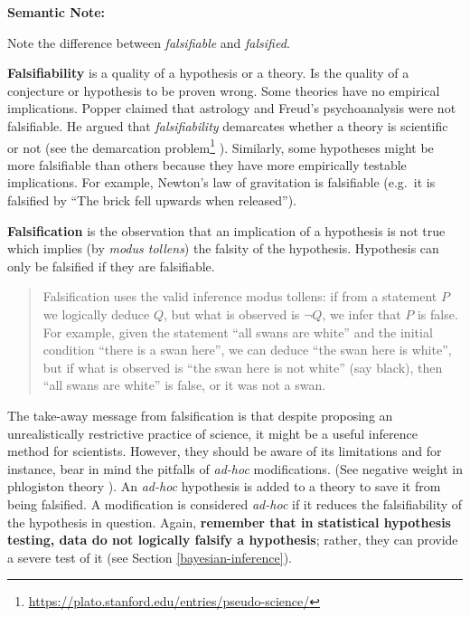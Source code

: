 \documentclass[
  12pt,
]{book}
\DeclareRobustCommand{\href}[2]{#2\footnote{\url{#1}}}
\begin{document}
\begin{tipbox}

\textbf{Semantic Note:}

Note the difference between \emph{falsifiable} and \emph{falsified}.

\textbf{Falsifiability} is a quality of a hypothesis or a theory. Is the quality of a conjecture or hypothesis to be proven wrong. Some theories have no empirical implications. Popper claimed that astrology and Freud's psychoanalysis were not falsifiable. He argued that \emph{falsifiability} demarcates whether a theory is scientific or not (see the \href{https://plato.stanford.edu/entries/pseudo-science/}{demarcation problem} \citep{sep-pseudo-science}). Similarly, some hypotheses might be more falsifiable than others because they have more empirically testable implications. For example, Newton's law of gravitation is falsifiable (e.g.~it is falsified by ``The brick fell upwards when released'').

\textbf{Falsification} is the observation that an implication of a hypothesis is not true which implies (by \emph{modus tollens}) the falsity of the hypothesis. Hypothesis can only be falsified if they are falsifiable.

\begin{quote}
Falsification uses the valid inference modus tollens: if from a statement \(P\) we logically deduce \(Q\), but what is observed is \(\lnot Q\), we infer that \(P\) is false. For example, given the statement ``all swans are white'' and the initial condition ``there is a swan here'', we can deduce ``the swan here is white'', but if what is observed is ``the swan here is not white'' (say black), then ``all swans are white'' is false, or it was not a swan.
\end{quote}

\end{tipbox}

The take-away message from falsification is that despite proposing an unrealistically restrictive practice of science, it might be a useful inference method for scientists. However, they should be aware of its limitations and for instance, bear in mind the pitfalls of \emph{ad-hoc} modifications. (See negative weight in phlogiston theory \citep{phlogiston}). An \emph{ad-hoc} hypothesis is added to a theory to save it from being falsified. A modification is considered \emph{ad-hoc} if it reduces the falsifiability of the hypothesis in question. Again, \textbf{remember that in statistical hypothesis testing, data do not logically falsify a hypothesis}; rather, they can provide a severe test of it \citep{mayo2021statistical} (see Section \ref{bayesian-inference}).
\end{document}
